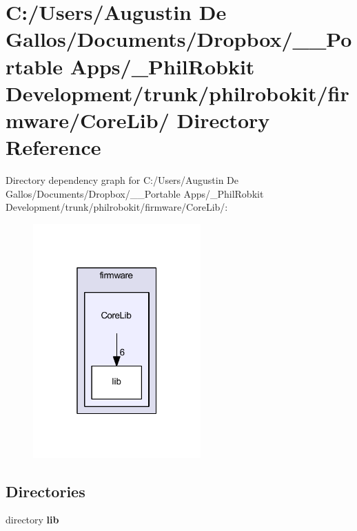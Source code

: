 \section{C\-:/\-Users/\-Augustin De Gallos/\-Documents/\-Dropbox/\-\_\-\-\_\-\-Portable Apps/\-\_\-\-Phil\-Robkit Development/trunk/philrobokit/firmware/\-Core\-Lib/ Directory Reference}
\label{dir_71ac2af858992f41fdb4b37202a6947d}
Directory dependency graph for C\-:/\-Users/\-Augustin De Gallos/\-Documents/\-Dropbox/\-\_\-\-\_\-\-Portable Apps/\-\_\-\-Phil\-Robkit Development/trunk/philrobokit/firmware/\-Core\-Lib/\-:\nopagebreak
\begin{figure}[H]
\begin{center}
\leavevmode
\includegraphics[width=182pt]{dir_71ac2af858992f41fdb4b37202a6947d_dep}
\end{center}
\end{figure}
\subsection*{Directories}
\begin{DoxyCompactItemize}
\item 
directory {\bf lib}
\end{DoxyCompactItemize}
